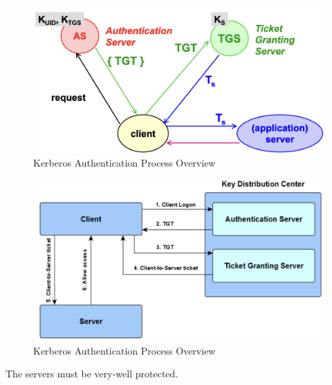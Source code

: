 \begin{multicols}{2}

    \begin{figure}[H]
        \centering
        \includegraphics[width=\linewidth]{Images/Authentication/kerberosOverview.png}
        \caption{Kerberos Authentication Process Overview}
    \end{figure}
    \columnbreak

    \begin{figure}[H]
        \centering
        \includegraphics[width=\linewidth]{Images/Authentication/ker.png}
        \caption{Kerberos Authentication Process Overview}
    \end{figure}
    
\end{multicols}

\begin{tcolorbox}[colback=red!10!white, colframe=red!70!black, coltitle=white, title=Beware]
The servers must be very-well protected.
\end{tcolorbox}

\clearpage

